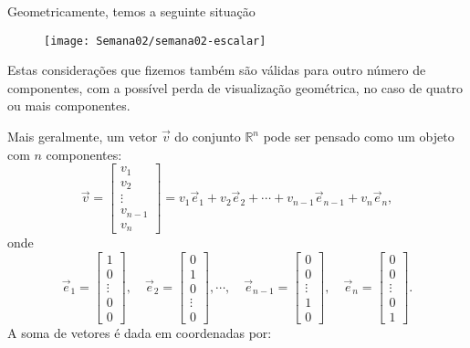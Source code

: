 Geometricamente, temos a seguinte situação
\begin{figure}[h!]
\begin{center}
\texttt{[image: Semana02/semana02-escalar]}
\end{center}
\end{figure}



Estas considerações que fizemos também são válidas para outro número de componentes, com a possível perda de visualização geométrica, no caso de quatro ou mais componentes.

Mais geralmente, um vetor $\vec{v}$ do conjunto $\mathbb{R}^n$ pode ser pensado como um objeto com $n$ componentes:
\begin{equation}
\vec{v} =
\left[
  \begin{array}{c}
    v_1 \\
    v_2 \\
   \vdots \\
    v_{n-1} \\
    v_n
  \end{array}
\right]
= v_1 \vec{e}_1 + v_2 \vec{e}_2 + \cdots + v_{n-1} \vec{e}_{n-1} + v_{n} \vec{e}_{n},
\end{equation} onde
\begin{equation}
\vec{e}_1 =
\left[
  \begin{array}{c}
    1 \\
    0 \\
  \vdots \\
    0 \\
    0
  \end{array}
\right], \quad
\vec{e}_2 =
\left[
  \begin{array}{c}
    0 \\
    1 \\
    0 \\
  \vdots \\
    0
  \end{array}
\right],   \cdots, \quad
\vec{e}_{n-1} =
\left[
  \begin{array}{c}
    0 \\
    0 \\
  \vdots \\
    1 \\
    0
  \end{array}
\right], \quad
\vec{e}_n =
\left[
  \begin{array}{c}
    0 \\
    0 \\
  \vdots \\
    0 \\
    1
  \end{array}
\right].
\end{equation} A soma de vetores é dada em coordenadas por:
